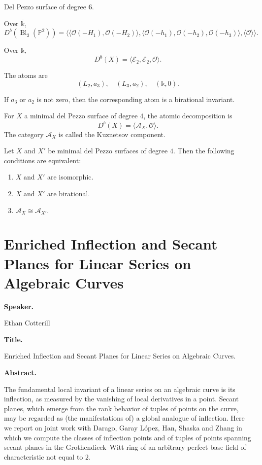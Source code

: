 \begin{example}
Del Pezzo surface of degree $6$.

Over $\overline{\mathbb k}$,
$$
D^b(\operatorname{Bl}_3(\mathbb P^2))
=
\langle
\langle \mathcal O(-H_1),
\mathcal O(-H_2)\rangle,
\langle \mathcal O(-h_1),
\mathcal O(-h_2),
\mathcal O(-h_3)\rangle,
\langle \mathcal O\rangle
\rangle.
$$

Over $\mathbb k$,
$$
D^b(X)
=
\langle
\mathcal E_2,
\mathcal E_2,
\mathcal O
\rangle.
$$

The atoms are
$$
(L_2,a_3),\quad
(L_3,a_2),\quad
(\mathbb k,0).
$$

If $a_3$ or $a_2$ is not zero, then
the corresponding atom is a birational
invariant.
\end{example}

\begin{example}
For $X$ a minimal del Pezzo surface of
degree $4$, the atomic decomposition
is
$$
D^b(X)=\langle \mathcal A_X,\mathcal O
\rangle.
$$
The category $\mathcal A_X$ is called
the Kuznetsov component.
\end{example}

\begin{theorem}
Let $X$ and $X'$ be minimal del Pezzo
surfaces of degree $4$.
Then the following conditions are
equivalent:
\begin{enumerate}
\item $X$ and $X'$ are isomorphic.
\item $X$ and $X'$ are birational.
\item $\mathcal A_X\cong \mathcal A_{X'}$.
\end{enumerate}
\end{theorem}

\section{Enriched Inflection and Secant
Planes for Linear Series on Algebraic
Curves}
\label{section-cotterill}

\medskip\noindent
{\bf Speaker.}

Ethan Cotterill

\medskip\noindent
{\bf Title.}

Enriched Inflection and Secant
Planes for Linear Series on Algebraic
Curves.

\medskip\noindent
{\bf Abstract.}

The fundamental local invariant of a
linear series on an algebraic curve is
its inflection, as measured by the
vanishing of local derivatives in a
point.
Secant planes, which emerge from the
rank behavior of tuples of points on
the curve, may be regarded as (the
manifestations of) a global analogue
of inflection.
Here we report on joint work with
Darago, Garay López, Han, Shaska and
Zhang in which we compute the classes
of inflection points and of tuples of
points spanning secant planes in the
Grothendieck--Witt ring of an
arbitrary perfect base field of
characteristic not equal to $2$.

